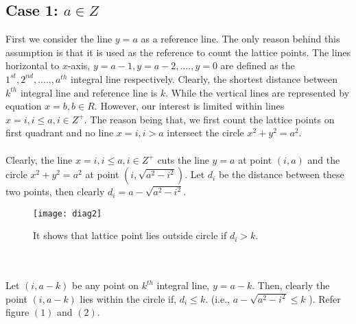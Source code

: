 \documentclass[journal,twoside]{IEEEtran}
\begin{document}
\subsection{Case 1: $a \in Z$}
First we consider the line $y=a$ as a reference line. The only reason behind this assumption is that it is used as the reference to count the lattice points. The lines horizontal to $x$-axis, $y=a-1, y=a-2,....,y=0$ are defined as the $1^{st}, 2^{nd},....., a^{th}$ integral line respectively. Clearly, the shortest distance between $k^{th}$ integral line and reference line is $k.$ While the vertical lines are represented by equation $x=b, b \in R$. However, our interest is limited within lines $x=i,i \leq a,i \in Z^{+}$. The reason being that, we first count the lattice points on first quadrant and no line $x=i,i > a$ intersect the circle $x^{2}+y^{2}=a^{2}$.
\\\\ Clearly, the line $x=i, i \leq a, i \in Z^{+}$ cuts the line $y=a$ at point $(i,a)$ and the circle $x^{2}+y^{2}=a^{2}$ at point $(i, \sqrt{a^{2}-i^{2}})$. Let $d_{i}$ be the distance between these two points, then clearly $d_{i} = a- \sqrt{a^{2}-i^{2}}$.
\begin{figure}[h]
\caption{It shows that lattice point lies outside circle if $d_{i}>k$.}
\centering
\texttt{[image: diag2]}
\end{figure}
\\\\ Let $(i,a-k)$ be any point on $k^{th}$ integral line, $y=a-k$. Then, clearly the point $(i, a-k)$ lies within the circle if, $d_{i} \leq k$. (i.e., $a- \sqrt{a^{2}-i^{2}} \leq k$ ). Refer figure $(1)$ and $(2)$.
\end{document}
